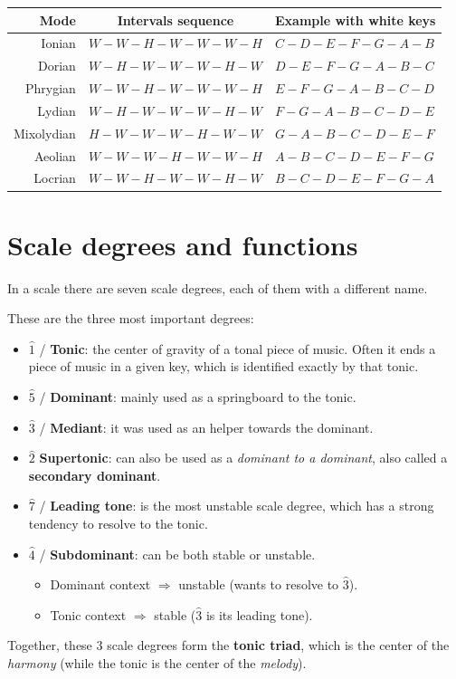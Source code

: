 \begin{center}
    \begin{tabular}{r|c|l}
        \textbf{Mode} & \textbf{Intervals sequence} & \textbf{Example with white keys} \\
        \hline
        {\color{OrangeRed}Ionian} & $W-W-H-W-W-W-H$ & $C-D-E-F-G-A-B$ \\ 
        Dorian & $W-H-W-W-W-H-W$ & $D-E-F-G-A-B-C$ \\
        Phrygian & $W-W-H-W-W-W-H$ & $E-F-G-A-B-C-D$ \\
        Lydian & $W-H-W-W-W-H-W$ & $F-G-A-B-C-D-E$ \\
        Mixolydian & $H-W-W-W-H-W-W$ & $G-A-B-C-D-E-F$ \\
        {\color{RoyalBlue}Aeolian} & $W-W-W-H-W-W-H$ & $A-B-C-D-E-F-G$ \\
        Locrian & $W-W-H-W-W-H-W$ & $B-C-D-E-F-G-A$ \\
    \end{tabular}
\end{center}

\section{Scale degrees and functions}
In a scale there are seven scale degrees, each of them with a different name.

These are the three most important degrees:
\begin{itemize}
    \item $\hat 1$ / \textbf{Tonic}: the center of gravity of a tonal piece of music. Often it ends a piece of music in a given key, which is identified exactly by that tonic.
    \item $\hat 5$ / \textbf{Dominant}: mainly used as a springboard to the tonic.
    \item $\hat 3$  / \textbf{Mediant}: it was used as an helper towards the dominant.
    \item $\hat 2$ \textbf{Supertonic}: can also be used as a \emph{dominant to a dominant}, also called a \textbf{secondary dominant}.
    \item $\hat 7$ / \textbf{Leading tone}: is the most unstable scale degree, which has a strong tendency to resolve to the tonic.
    \item $\hat 4$ / \textbf{Subdominant}: can be both stable or unstable.
    \begin{itemize}
        \item Dominant context $\Rightarrow$ unstable (wants to resolve to $\hat 3$).
        \item Tonic context $\Rightarrow$ stable ($\hat 3$ is its leading tone).
    \end{itemize}
\end{itemize}
Together, these 3 scale degrees form the \textbf{tonic triad}, which is the center of the \emph{harmony} (while the tonic is the center of the \emph{melody}).

